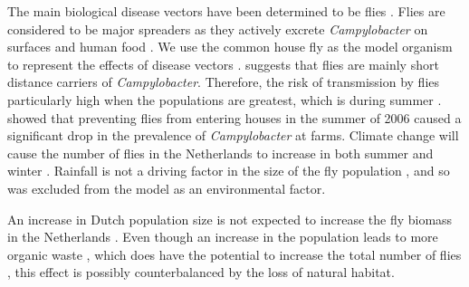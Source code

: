 
The main biological disease vectors have been determined to be flies  \parencite{mughini-gras_quantifying_2016}. Flies are considered to be major spreaders as they actively excrete \textit{Campylobacter} on surfaces and human food \parencite{french_molecular_2009, hald_influxed_2008, berndtson_campylobacter_1996}. We use the common house fly as the model organism to represent the effects of disease vectors \parencite{hald_influxed_2008}. \cite{skovgard_retention_2011} suggests that flies are mainly short distance carriers of \textit{Campylobacter}. Therefore, the risk of transmission by flies particularly high when the populations are greatest, which is during summer \parencite{royden_role_2016}. \cite{hald_use_2007} showed that preventing flies from entering houses in the summer of 2006 caused a significant drop in the prevalence of \textit{Campylobacter} at farms. 
Climate change will cause the number of flies in the Netherlands to increase in both summer and winter \parencite{goulson_predicting_2005}. Rainfall is not a driving factor in the size of the fly population \parencite{goulson_predicting_2005}, and so was excluded from the model as an environmental factor.


An increase in Dutch population size is not expected to increase the fly biomass in the Netherlands \parencite{guenat_effects_2019}. Even though an increase in the population leads to more organic waste \parencite{garcia-garcia_framework_2015}, which does have the potential to increase the total number of flies \parencite{imai_population_1984, rozendaal_houseflies_1997}, this effect is possibly counterbalanced by the loss of natural habitat.

